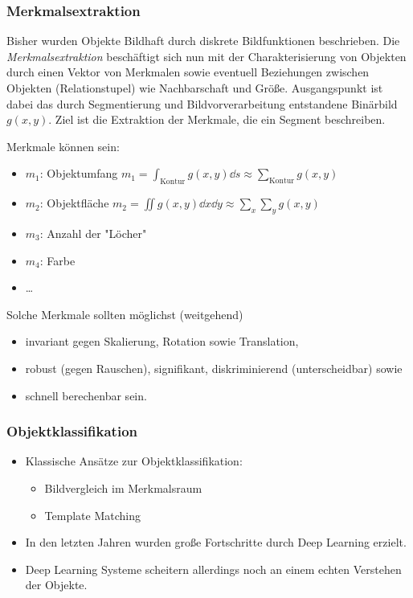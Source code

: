 			\subsubsection{Merkmalsextraktion}
				Bisher wurden Objekte Bildhaft durch diskrete Bildfunktionen beschrieben. Die \emph{Merkmalsextraktion} beschäftigt sich nun mit der Charakterisierung von Objekten durch einen Vektor von Merkmalen sowie eventuell Beziehungen zwischen Objekten (Relationstupel) wie Nachbarschaft und Größe. Ausgangspunkt ist dabei das durch Segmentierung und Bildvorverarbeitung entstandene Binärbild \( g(x, y) \). Ziel ist die Extraktion der Merkmale, die ein Segment beschreiben.

				Merkmale können \zB sein:
				\begin{itemize}
					\item \(m_1\): Objektumfang \( m_1 = \int_\text{Kontur} \! g(x, y) \dd{s} \approx \sum_\text{Kontur} g(x, y) \)
					\item \(m_2\): Objektfläche \( m_2 = \iint \! g(x, y) \dd{x} \dd{y} \approx \sum_x \sum_y g(x, y) \)
					\item \(m_3\): Anzahl der "Löcher"
					\item \(m_4\): Farbe
					\item \dots
				\end{itemize}
				Solche Merkmale sollten möglichst (weitgehend)
				\begin{itemize}
					\item invariant gegen Skalierung, Rotation sowie Translation,
					\item robust (gegen Rauschen), signifikant, diskriminierend (unterscheidbar) sowie
					\item schnell berechenbar sein.
				\end{itemize}

			\subsubsection{Objektklassifikation}
				\begin{itemize}
					\item Klassische Ansätze zur Objektklassifikation:
						\begin{itemize}
							\item Bildvergleich im Merkmalsraum
							\item Template Matching
						\end{itemize}
					\item In den letzten Jahren wurden große Fortschritte durch Deep Learning erzielt.
					\item Deep Learning Systeme scheitern allerdings noch an einem echten Verstehen der Objekte.
				\end{itemize}

